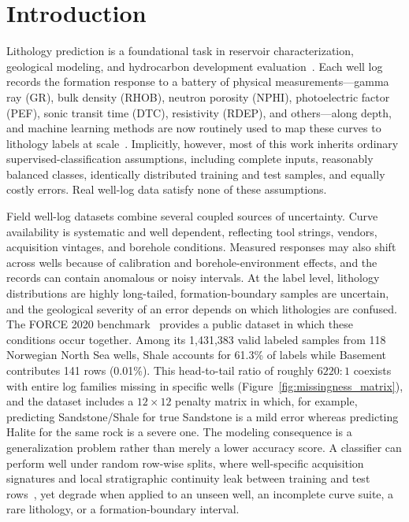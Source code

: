\documentclass[bdcc,article,submit,pdftex,moreauthors]{Definitions/mdpi}
\begin{document}
\sloppy

\section{Introduction}
\label{sec:intro}
Lithology prediction is a foundational task in reservoir characterization, geological
modeling, and hydrocarbon development evaluation~\cite{rider2011,ellis2007,doveton2014}. Each
well log records the formation response to a battery of physical measurements---gamma ray
(GR), bulk density (RHOB), neutron porosity (NPHI), photoelectric factor (PEF), sonic transit
time (DTC), resistivity (RDEP), and others---along depth, and machine learning methods are
now routinely used to map these curves to lithology labels at
scale~\cite{hall2016facies,merembayev2021,dev2019formation,carvalho2026benchmark}. Implicitly,
however, most of this work inherits ordinary supervised-classification assumptions, including
complete inputs, reasonably balanced classes, identically distributed training and test samples,
and equally costly errors. Real well-log data satisfy none of these
assumptions.

Field well-log datasets combine several coupled sources of uncertainty. Curve availability is
systematic and well dependent, reflecting tool strings, vendors, acquisition vintages, and
borehole conditions. Measured responses may also shift across wells because of calibration and
borehole-environment effects, and the records can contain anomalous or noisy intervals. At the
label level, lithology distributions are highly long-tailed, formation-boundary samples are
uncertain, and the geological severity of an error depends on which lithologies are confused.
The FORCE 2020 benchmark~\cite{bormann2020force} provides a public dataset in which these
conditions occur together. Among its 1{,}431{,}383 valid labeled samples from 118 Norwegian
North Sea wells, Shale accounts for 61.3\% of labels while Basement contributes 141 rows
(0.01\%). This head-to-tail ratio of roughly $6220{:}1$ coexists with entire log families
missing in specific wells (Figure~\ref{fig:missingness_matrix}), and the dataset includes a
$12{\times}12$ penalty matrix in which, for example, predicting Sandstone/Shale for true
Sandstone is a mild error whereas predicting Halite for the same rock is a severe one. The
modeling consequence is a generalization problem rather than merely a lower accuracy score. A
classifier can perform well under random row-wise splits, where well-specific acquisition
signatures and local stratigraphic continuity leak between training and test rows~\cite{rosenblatt2024,roberts2017cv,mila2022nndm},
yet degrade when applied to an unseen well, an incomplete curve suite, a rare lithology, or a
formation-boundary interval.
\end{document}
